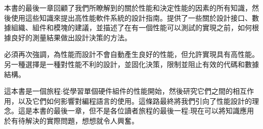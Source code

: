 本書的最後一章回顧了我們所瞭解到的關於性能和決定性能的因素的所有知識，然後使用這些知識來提出高性能軟件系統的設計指南。提供了一些關於設計接口、數據組織、組件和模塊的建議，並描述了在有一個性能可以測試的實現之前，如何根據良好的測量結果做出設計決策的方法。

必須再次強調，為性能而設計不會自動產生良好的性能，但允許實現具有高性能。另一種選擇是一種對性能不利的設計，並固化決策，限制並阻止有效的代碼和數據結構。

這本書是一個旅程:從學習單個硬件組件的性能開始，然後研究它們之間的相互作用，以及它們如何影響對編程語言的使用。這條路最終將我們引向了性能設計的理念。這是本書的最後一章，但不是各位讀者旅程的最後一程:現在可以將知識應用於有待解決的實際問題，想想就令人興奮。